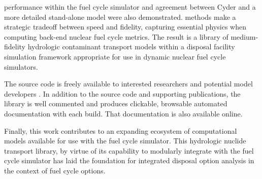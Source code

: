 \Cyder performance within the \Cyclus fuel cycle simulator and agreement
between Cyder and a more detailed stand-alone model were also demonstrated.
\Cyder methods make a strategic tradeoff between speed and fidelity, capturing
essential physics when computing back-end nuclear fuel cycle metrics. The
result is a library of medium-fidelity hydrologic contaminant transport models
within a disposal facility simulation framework appropriate for use in dynamic
nuclear fuel cycle simulators.

The \Cyder source code is freely available to interested researchers and
potential model developers \cite{huff_cyder_2013}.  In addition to the source
code and supporting publications, the \Cyder library is well commented and
produces clickable, browsable automated documentation with each build. That
documentation is also available online.

Finally, this work contributes to an expanding ecosystem of computational
models available for use with the \Cyclus fuel cycle simulator. This hydrologic
nuclide transport library, by virtue of its capability to modularly integrate
with the \Cyclus fuel cycle simulator has laid the foundation for integrated
disposal option analysis in the context of fuel cycle options.

